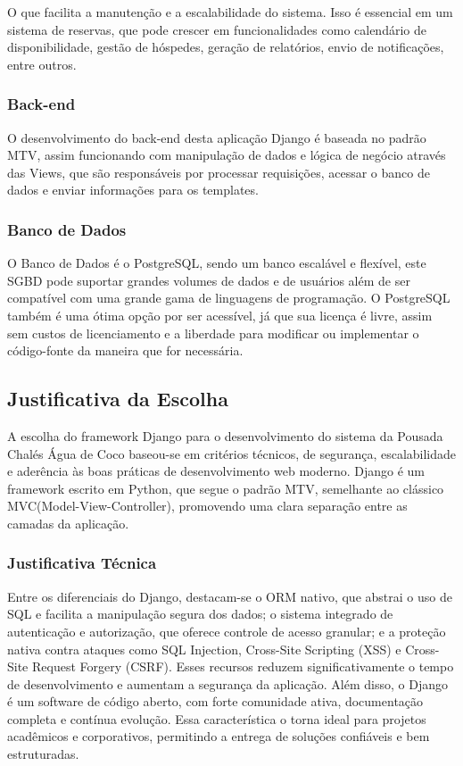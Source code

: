 \documentclass[
	12pt,				%
	openany,			%
	twoside,			%
	a4paper,			%
	english,			%
	french,				%
	spanish,			%
	brazil				%
	]{abntex2}
\begin{document}
O que facilita a manutenção e a escalabilidade do sistema. Isso é essencial em um sistema de reservas, que pode crescer em funcionalidades como calendário de disponibilidade, gestão de hóspedes, geração de relatórios, envio de notificações, entre outros.

\subsubsection{Back-end}

O desenvolvimento do back-end desta aplicação Django é baseada no padrão MTV, assim funcionando com manipulação de dados e lógica de negócio através das Views, que são responsáveis por processar requisições, acessar o banco de dados e enviar informações para os templates.

\subsubsection{Banco de Dados}

O Banco de Dados é o PostgreSQL, sendo um banco escalável e flexível, este SGBD pode suportar grandes volumes de dados e de usuários além de ser compatível com uma grande gama de linguagens de programação.
O PostgreSQL também é uma ótima opção por ser acessível, já que sua licença é livre, assim sem custos de licenciamento e a liberdade para modificar ou implementar o código-fonte da maneira que for necessária.

\subsection{Justificativa da Escolha}

A escolha do framework Django para o desenvolvimento do sistema da Pousada Chalés Água de Coco baseou-se em critérios técnicos, de segurança, escalabilidade e aderência às boas práticas de desenvolvimento web moderno. Django é um framework escrito em Python, que segue o padrão MTV, semelhante ao clássico MVC(Model-View-Controller), promovendo uma clara separação entre as camadas da aplicação.

\subsubsection{Justificativa Técnica}

Entre os diferenciais do Django, destacam-se o ORM nativo, que abstrai o uso de SQL e facilita a manipulação segura dos dados; o sistema integrado de autenticação e autorização, que oferece controle de acesso granular; e a proteção nativa contra ataques como SQL Injection, Cross-Site Scripting (XSS) e Cross-Site Request Forgery (CSRF). Esses recursos reduzem significativamente o tempo de desenvolvimento e aumentam a segurança da aplicação.
Além disso, o Django é um software de código aberto, com forte comunidade ativa, documentação completa e contínua evolução. Essa característica o torna ideal para projetos acadêmicos e corporativos, permitindo a entrega de soluções confiáveis e bem estruturadas.
\end{document}
